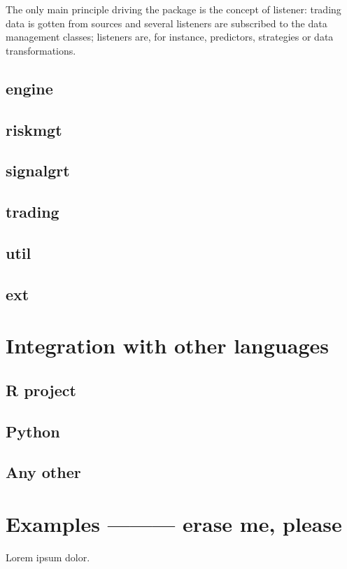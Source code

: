 \documentclass[11pt,a4paper]{article}
\begin{document}
The only main principle driving the package is the concept of listener:
trading data is gotten from sources and several listeners are subscribed to
the data management classes; listeners are, for instance, predictors,
strategies or data transformations.

\subsection{engine}

\subsection{riskmgt}

\subsection{signalgrt}

\subsection{trading}

\subsection{util}

\subsection{ext}

\section{Integration with other languages}

\subsection{R project}

\subsection{Python}

\subsection{Any other}

\section{Examples --------- erase me, please}
Lorem ipsum dolor.
\end{document}
